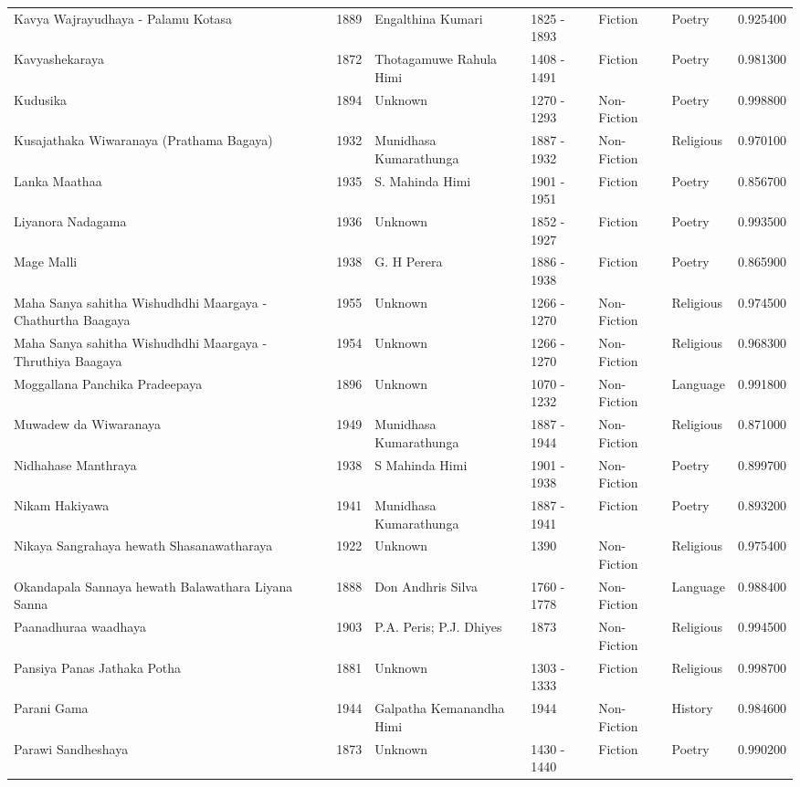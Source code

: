 \begin{tabular}{lrllllr}
Kavya Wajrayudhaya - Palamu Kotasa & 1889 & Engalthina Kumari & 1825 - 1893 & Fiction & Poetry & 0.925400 \\
Kavyashekaraya & 1872 & Thotagamuwe Rahula Himi & 1408 - 1491 & Fiction & Poetry & 0.981300 \\
Kudusika & 1894 & Unknown & 1270 - 1293 & Non-Fiction & Poetry & 0.998800 \\
Kusajathaka Wiwaranaya (Prathama Bagaya) & 1932 & Munidhasa Kumarathunga & 1887 - 1932 & Non-Fiction & Religious & 0.970100 \\
Lanka Maathaa & 1935 & S. Mahinda Himi & 1901 - 1951 & Fiction & Poetry & 0.856700 \\
Liyanora Nadagama & 1936 & Unknown & 1852 - 1927 & Fiction & Poetry & 0.993500 \\
Mage Malli & 1938 & G. H Perera & 1886 - 1938 & Fiction & Poetry & 0.865900 \\
Maha Sanya sahitha Wishudhdhi Maargaya - Chathurtha Baagaya & 1955 & Unknown & 1266 - 1270 & Non-Fiction & Religious & 0.974500 \\
Maha Sanya sahitha Wishudhdhi Maargaya - Thruthiya Baagaya & 1954 & Unknown & 1266 - 1270 & Non-Fiction & Religious & 0.968300 \\
Moggallana Panchika Pradeepaya & 1896 & Unknown & 1070 - 1232 & Non-Fiction & Language & 0.991800 \\
Muwadew da Wiwaranaya & 1949 & Munidhasa Kumarathunga & 1887 - 1944 & Non-Fiction & Religious & 0.871000 \\
Nidhahase Manthraya & 1938 & S Mahinda Himi & 1901 - 1938 & Non-Fiction & Poetry & 0.899700 \\
Nikam Hakiyawa & 1941 & Munidhasa Kumarathunga & 1887 - 1941 & Fiction & Poetry & 0.893200 \\
Nikaya Sangrahaya hewath Shasanawatharaya & 1922 & Unknown & 1390 & Non-Fiction & Religious & 0.975400 \\
Okandapala Sannaya hewath Balawathara Liyana Sanna & 1888 & Don Andhris Silva & 1760 - 1778 & Non-Fiction & Language & 0.988400 \\
Paanadhuraa waadhaya & 1903 & P.A. Peris; P.J. Dhiyes & 1873 & Non-Fiction & Religious & 0.994500 \\
Pansiya Panas Jathaka Potha & 1881 & Unknown & 1303 - 1333 & Fiction & Religious & 0.998700 \\
Parani Gama & 1944 & Galpatha Kemanandha Himi & 1944 & Non-Fiction & History & 0.984600 \\
Parawi Sandheshaya & 1873 & Unknown & 1430 - 1440 & Fiction & Poetry & 0.990200 \\

\end{tabular}
